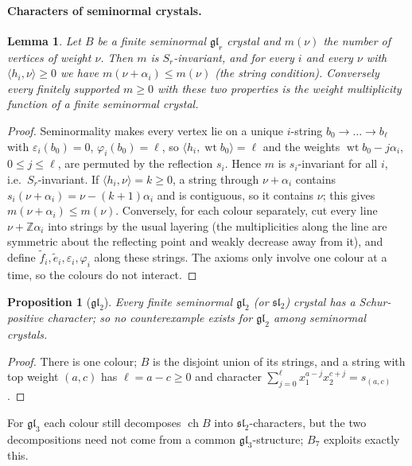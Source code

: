\documentclass[11pt]{article}
\newtheorem{lemma}[theorem]{Lemma}
\newtheorem{proposition}[theorem]{Proposition}
\theoremstyle{definition}
\theoremstyle{remark}
\newcommand{\wt}{\operatorname{wt}}
\newcommand{\ch}{\operatorname{ch}}
\newcommand{\Z}{\mathbb Z}
\begin{document}
\paragraph{Characters of seminormal crystals.}
\begin{lemma}\label{lem:semi}
Let $B$ be a finite seminormal $\mathfrak{gl}_r$ crystal and $m(\nu)$ the number of vertices of
weight $\nu$. Then $m$ is $S_r$-invariant, and for every $i$ and every $\nu$ with
$\langle h_i,\nu\rangle\ge0$ we have $m(\nu+\alpha_i)\le m(\nu)$ (the \emph{string condition}).
Conversely every finitely supported $m\ge0$ with these two properties is the weight
multiplicity function of a finite seminormal crystal.
\end{lemma}
\begin{proof}
Seminormality makes every vertex lie on a unique $i$-string $b_0\to\dots\to b_\ell$ with
$\varepsilon_i(b_0)=0$, $\varphi_i(b_0)=\ell$, so $\langle h_i,\wt b_0\rangle=\ell$ and the
weights $\wt b_0-j\alpha_i$, $0\le j\le\ell$, are permuted by the reflection $s_i$. Hence $m$ is
$s_i$-invariant for all $i$, i.e.\ $S_r$-invariant. If $\langle h_i,\nu\rangle=k\ge0$, a string
through $\nu+\alpha_i$ contains $s_i(\nu+\alpha_i)=\nu-(k+1)\alpha_i$ and is contiguous, so it
contains $\nu$; this gives $m(\nu+\alpha_i)\le m(\nu)$. Conversely, for each colour separately,
cut every line $\nu+\Z\alpha_i$ into strings by the usual layering (the multiplicities along the
line are symmetric about the reflecting point and weakly decrease away from it), and define
$\tilde f_i,\tilde e_i,\varepsilon_i,\varphi_i$ along these strings. The axioms only involve one
colour at a time, so the colours do not interact.
\end{proof}

\begin{proposition}[$\mathfrak{gl}_2$]
Every finite seminormal $\mathfrak{gl}_2$ (or $\mathfrak{sl}_2$) crystal has a Schur-positive
character; so no counterexample exists for $\mathfrak{gl}_2$ among seminormal crystals.
\end{proposition}
\begin{proof}
There is one colour; $B$ is the disjoint union of its strings, and a string with top weight
$(a,c)$ has $\ell=a-c\ge0$ and character $\sum_{j=0}^{\ell}x_1^{a-j}x_2^{c+j}=s_{(a,c)}$.
\end{proof}
For $\mathfrak{gl}_3$ each colour still decomposes $\ch B$ into $\mathfrak{sl}_2$-characters,
but the two decompositions need not come from a common $\mathfrak{gl}_3$-structure; $B_7$
exploits exactly this.
\end{document}
